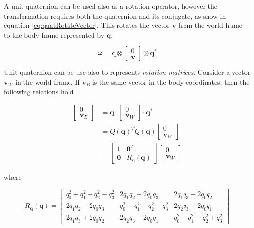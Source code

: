 \noindent A unit quaternion can be used also as a rotation operator, however the transformation requires both the quaternion and its conjugate, as show in equation \eqref{eq:quatRotateVector}. This rotates the vector $\mathbf{v}$ from the world frame to the body frame represented by $\mathbf{q}$.

\begin{equation}
	\boldsymbol{\omega} = \mathbf{q} \otimes 
	\begin{bmatrix}
		0 \\
		\mathbf{v}
	\end{bmatrix}
	\otimes \mathbf{q}^*
	\label{eq:quatRotateVector}
\end{equation}

\noindent Unit quaternion can be use also to represents \textit{rotation matrices}. Consider a vector $\mathbf{v}_W$ in the world frame. If $\mathbf{v}_B$ is the same vector in the body coordinates, then the following relations hold

\begin{align}
	\begin{bmatrix}
		0 \\
		\mathbf{v}_B
	\end{bmatrix}
	&= \mathbf{q} \cdot
	\begin{bmatrix}
		0 \\
		\mathbf{v}_W
	\end{bmatrix}
	\cdot \mathbf{q}^* \\
	&= \bar{Q}(\mathbf{q})^T Q(\mathbf{q})
	\begin{bmatrix}
		0 \\
		\mathbf{v}_W
	\end{bmatrix} \\
	&=
	\begin{bmatrix}
		1          & \mathbf{0}^T \\
		\mathbf{0} & R_{\mathbf{q}}(\mathbf{q})
	\end{bmatrix}
	\begin{bmatrix}
		0 \\
		\mathbf{v}_W
	\end{bmatrix}
	\label{eq:quatRotationMatrix1}
\end{align}

\noindent where

\begin{equation}
	R_{\mathbf{q}}(\mathbf{q}) =
	\begin{bmatrix}
		q_0^2+q_1^2-q_2^2-q_3^2 & 2q_1q_2+2q_0q_3         & 2q_1q_3-2q_0q_2 \\
		2q_1q_2-2q_0q_3         & q_0^2-q_1^2+q_2^2-q_3^2 & 2q_2q_3+2q_0q_1 \\
		2q_1q_3+2q_0q_2         & 2q_2q_3-2q_0q_1         & q_0^2-q_1^2-q_2^2+q_3^2
	\end{bmatrix}
	\label{eq:quatRotationMatrix2}
\end{equation}

